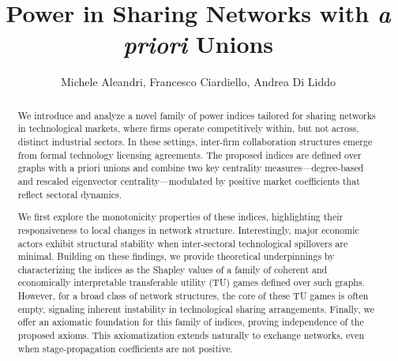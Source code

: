 \documentclass[preprint,11pt,authoryear]{elsarticle}
\theoremstyle{plain}
\begin{document}
\begin{frontmatter}

\title{Power in Sharing Networks with \textit{a priori} Unions}

\author[Mich,Fra,An]
{Michele Aleandri, Francesco Ciardiello, Andrea Di Liddo} 


\begin{abstract}
We introduce and analyze a novel family of power indices tailored for sharing networks in technological markets, where firms operate competitively within, but not across, distinct industrial sectors. In these settings, inter-firm collaboration structures emerge from formal technology licensing agreements. The proposed indices are defined over graphs with a priori unions and combine two key centrality measures—degree-based and rescaled eigenvector centrality—modulated by positive market coefficients that reflect sectoral dynamics.

We first explore the monotonicity properties of these indices, highlighting their responsiveness to local changes in network structure. Interestingly, major economic actors exhibit structural stability when inter-sectoral technological spillovers are minimal. Building on these findings, we provide theoretical underpinnings by characterizing the indices as the Shapley values of a family of coherent and economically interpretable transferable utility (TU) games defined over such graphs. However, for a broad class of network structures, the core of these TU games is often empty, signaling inherent instability in technological sharing arrangements.
Finally, we offer an axiomatic foundation for this family of indices, proving independence of the proposed axioms. This axiomatization extends naturally to exchange networks, even when stage-propagation coefficients are not positive.
\end{abstract}


\end{frontmatter}
\end{document}
